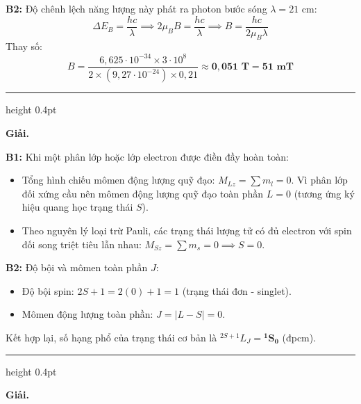 \documentclass[11pt,a4paper]{article}
\renewcommand{\boldsymbol}[1]{\symbf{#1}}
\let\DeBaiOriginal\DeBai
\renewcommand{\DeBai}[1]{\par\Needspace{5\baselineskip}\DeBaiOriginal{#1}}
\newcommand{\PhanCachBai}{%
  \par\Needspace{7\baselineskip}%
  \addvspace{6pt}%
  {\color{black!40}\hrule height 0.4pt}%
  \nobreak\vspace{7pt}\nobreak
}
\begin{document}
\textbf{B2:} Độ chênh lệch năng lượng này phát ra photon bước sóng $\lambda = 21\text{ cm}$:
\begin{equation*}
    \Delta E_B = \frac{h c}{\lambda} \implies 2 \mu_B B = \frac{h c}{\lambda} \implies B = \frac{h c}{2 \mu_B \lambda}
\end{equation*}
Thay số:
\begin{equation*}
    B = \frac{6{,}625 \cdot 10^{-34} \times 3 \cdot 10^8}{2 \times (9{,}27 \cdot 10^{-24}) \times 0{,}21} \approx \boldsymbol{0{,}051\text{ T}} = \boldsymbol{51\text{ mT}}
\end{equation*}

\PhanCachBai


\textbf{Giải.}

\textbf{B1:} Khi một phân lớp hoặc lớp electron được điền đầy hoàn toàn:
\begin{itemize}[leftmargin=*, topsep=1pt, itemsep=1pt]
  \item Tổng hình chiếu mômen động lượng quỹ đạo: $M_{Lz} = \sum m_l = 0$. Vì phân lớp đối xứng cầu nên mômen động lượng quỹ đạo toàn phần $L = 0$ (tương ứng ký hiệu quang học trạng thái $S$).
  \item Theo nguyên lý loại trừ Pauli, các trạng thái lượng tử có đủ electron với spin đối song triệt tiêu lẫn nhau: $M_{Sz} = \sum m_s = 0 \implies S = 0$.
\end{itemize}

\textbf{B2:} Độ bội và mômen toàn phần $J$:
\begin{itemize}[leftmargin=*, topsep=1pt, itemsep=1pt]
  \item Độ bội spin: $2S + 1 = 2(0) + 1 = 1$ (trạng thái đơn - singlet).
  \item Mômen động lượng toàn phần: $J = |L - S| = 0$.
\end{itemize}
Kết hợp lại, số hạng phổ của trạng thái cơ bản là $^{2S+1}L_J = \boldsymbol{^1S_0}$ (đpcm).

\PhanCachBai


\textbf{Giải.}
\end{document}
